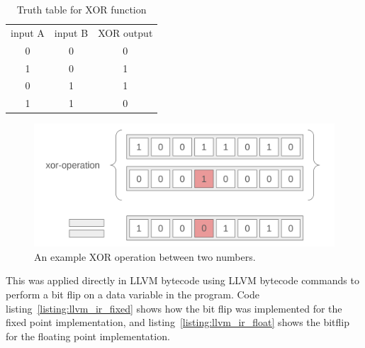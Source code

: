 \begin{table}[htb]
    \centering
\caption{Truth table for XOR function}
    \label{table:xor_truth_table}
\begin{tabular}{c|c|c}\label{table:xor_truth_table}
     input A& input B& XOR output \\
     0&0&0\\
     1&0&1\\
     0&1&1\\
     1&1&0
\end{tabular}
    
\end{table}



\begin{figure}[h!]
    \centering
    \includegraphics[width=0.75\linewidth]{Images/xor_operation.png}
    \caption{An example XOR operation between two numbers.}
    \label{fig:xor_operation}
\end{figure}

This was applied directly in LLVM bytecode using LLVM bytecode commands to perform a bit flip on a data variable in the program. Code listing~\ref{listing:llvm_ir_fixed} shows how the bit flip was implemented for the fixed point implementation, and listing~\ref{listing:llvm_ir_float} shows the bitflip for the floating point implementation.



